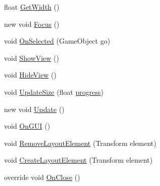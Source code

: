 \begin{DoxyCompactItemize}
\item 
float \hyperlink{class_unity_editor_1_1_u_i_1_1_windows_1_1_plugins_1_1_flow_1_1_editors_1_1_flow_hierarchy_window_a6664f73408a4a47b3f9dffea4effc6e4}{Get\+Width} ()
\item 
new void \hyperlink{class_unity_editor_1_1_u_i_1_1_windows_1_1_plugins_1_1_flow_1_1_editors_1_1_flow_hierarchy_window_a3d59d6118f9b880e96ae845d73f6133a}{Focus} ()
\item 
void \hyperlink{class_unity_editor_1_1_u_i_1_1_windows_1_1_plugins_1_1_flow_1_1_editors_1_1_flow_hierarchy_window_ac3d9eeb5caab9643e5ea37554e0f697b}{On\+Selected} (Game\+Object go)
\item 
void \hyperlink{class_unity_editor_1_1_u_i_1_1_windows_1_1_plugins_1_1_flow_1_1_editors_1_1_flow_hierarchy_window_aadd72b12443e5fcd49829e9a23023701}{Show\+View} ()
\item 
void \hyperlink{class_unity_editor_1_1_u_i_1_1_windows_1_1_plugins_1_1_flow_1_1_editors_1_1_flow_hierarchy_window_af27ec767e9c5eb57eea6a854f6e89565}{Hide\+View} ()
\item 
void \hyperlink{class_unity_editor_1_1_u_i_1_1_windows_1_1_plugins_1_1_flow_1_1_editors_1_1_flow_hierarchy_window_aecd8eafbd3d7ba80d8453ae9dcda3777}{Update\+Size} (float \hyperlink{class_unity_editor_1_1_editor_window_ext_ad4fc5cfe734a2117bf611005da84573e}{progress})
\item 
new void \hyperlink{class_unity_editor_1_1_u_i_1_1_windows_1_1_plugins_1_1_flow_1_1_editors_1_1_flow_hierarchy_window_a4c4d4f066840d62fe7ffdb11748efd8c}{Update} ()
\item 
void \hyperlink{class_unity_editor_1_1_u_i_1_1_windows_1_1_plugins_1_1_flow_1_1_editors_1_1_flow_hierarchy_window_a794bf039a37dad4f9e7786e08338d9e5}{On\+G\+U\+I} ()
\item 
void \hyperlink{class_unity_editor_1_1_u_i_1_1_windows_1_1_plugins_1_1_flow_1_1_editors_1_1_flow_hierarchy_window_a542708331eaa5b1ad1ecc740c0b93828}{Remove\+Layout\+Element} (Transform element)
\item 
void \hyperlink{class_unity_editor_1_1_u_i_1_1_windows_1_1_plugins_1_1_flow_1_1_editors_1_1_flow_hierarchy_window_af67bd4c328fd51bc35c84f9cc0077faa}{Create\+Layout\+Element} (Transform element)
\item 
override void \hyperlink{class_unity_editor_1_1_u_i_1_1_windows_1_1_plugins_1_1_flow_1_1_editors_1_1_flow_hierarchy_window_a90070337fb31560102cde99a8df65d5f}{On\+Close} ()
\item 

\end{DoxyCompactItemize}
